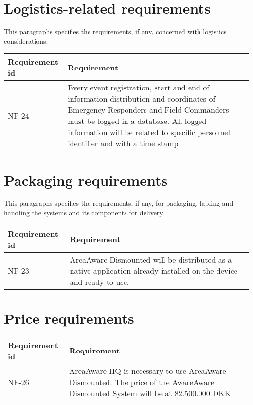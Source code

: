 \section{Logistics-related requirements}
This paragraphs specifies the requirements, if  any, concerned with logistics considerations.

\begin{longtable}{| p{3.2cm} |  p{10cm} | }
	\hline
	\textbf{Requirement id} &  \textbf{Requirement } \\
	\hline
	NF-24 & Every event registration, start and end of information distribution and coordinates of Emergency Responders and Field Commanders must be logged in a database. All logged information will be related to specific personnel identifier and with a time stamp  \\
	\hline
\end{longtable}

\label{sec_nonFunc7}
\section{Packaging requirements}
This paragraphs specifies the requirements, if any, for packaging, labling and handling the systems and its components for delivery.

\begin{longtable}{| p{3.2cm} |  p{10cm} | }
	\hline
	\textbf{Requirement id} &  \textbf{Requirement } \\
	\hline
	NF-23 & AreaAware Dismounted will be distributed as a native application already installed on the device and ready to use. \\
	\hline
\end{longtable}

\section{Price requirements}

\begin{longtable}{| p{3.2cm} |  p{10cm} | }
	\hline
	\textbf{Requirement id} &  \textbf{Requirement } \\
	\hline
	NF-26 & AreaAware HQ is necessary to use AreaAware Dismounted. The price of the AwareAware Dismounted System will be at 82.500.000 DKK  \\
	\hline
\end{longtable}